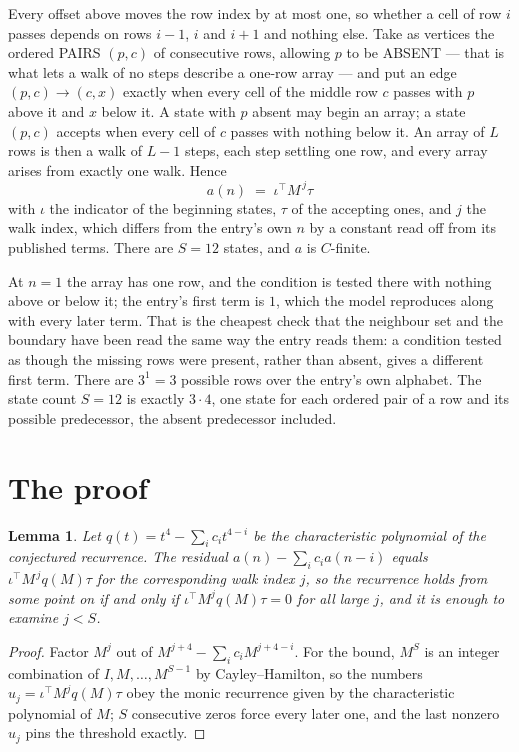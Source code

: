\documentclass[11pt,a4paper]{article}
\theoremstyle{plain}
\newtheorem{lemma}[theorem]{Lemma}
\theoremstyle{definition}
\begin{document}
Every offset above moves the row index by at most one, so whether a cell of row $i$ passes
depends on rows $i-1$, $i$ and $i+1$ and nothing else. Take as vertices the ordered PAIRS
$(p,c)$ of consecutive rows, allowing $p$ to be ABSENT --- that is what lets a walk of no steps
describe a one-row array --- and put an edge $(p,c)\to(c,x)$ exactly when every cell of the
middle row $c$ passes with $p$ above it and $x$ below it. A state with $p$ absent may begin an
array; a state $(p,c)$ accepts when every cell of $c$ passes with nothing below it. An array of
$L$ rows is then a walk of $L-1$ steps, each step settling one row, and every array arises from
exactly one walk. Hence
\[
a(n)\;=\;\iota^{\!\top}M^{\,j}\tau
\]
with $\iota$ the indicator of the beginning states, $\tau$ of the accepting ones, and $j$ the
walk index, which differs from the entry's own $n$ by a constant read off from its published
terms. There are $S=12$ states, and $a$ is $C$-finite.

At $n=1$ the array has one row, and
the condition is tested there with nothing above or below it; the entry's first term is
$1$, which the model reproduces along with every later term. That is the cheapest check
that the neighbour set and the boundary have been read the same way the entry reads them: a
condition tested as though the missing rows were present, rather than absent, gives a different
first term. There are $3^{1}=3$ possible rows over the entry's own alphabet. The state count $S=12$ is exactly $3\cdot4$,
one state for each ordered pair of a row and its possible predecessor, the absent predecessor
included.

\section{The proof}

\begin{lemma}\label{lem:crit}
Let $q(t)=t^{4}-\sum_i c_it^{4-i}$ be the characteristic polynomial of the
conjectured recurrence. The residual $a(n)-\sum_ic_ia(n-i)$ equals
$\iota^{\!\top}M^{\,j}q(M)\tau$ for the corresponding walk index $j$, so the recurrence
holds from some point on if and only if $\iota^{\!\top}M^{j}q(M)\tau=0$ for all large $j$,
and it is enough to examine $j<S$.
\end{lemma}

\begin{proof}
Factor $M^{j}$ out of $M^{j+4}-\sum_ic_iM^{j+4-i}$. For the bound, $M^{S}$
is an integer combination of $I,M,\dots,M^{S-1}$ by Cayley--Hamilton, so the numbers
$u_j=\iota^{\!\top}M^{j}q(M)\tau$ obey the monic recurrence given by the characteristic
polynomial of $M$; $S$ consecutive zeros force every later one, and the last nonzero $u_j$
pins the threshold exactly.
\end{proof}
\end{document}
